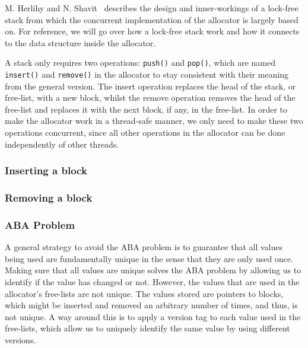 M. Herlihy and N. Shavit~\cite[Chapter 11]{artofmpprogramming} describes the design and inner-workings of a lock-free stack from which the concurrent implementation of the allocator is largely based on. For reference, we will go over how a lock-free stack work and how it connects to the data structure inside the allocator.

A stack only requires two operations: \texttt{push()} and \texttt{pop()}, which are named \texttt{insert()} and \texttt{remove()} in the allocator to stay consistent with their meaning from the general version. The insert operation replaces the head of the stack, or free-list, with a new block, whilst the remove operation removes the head of the free-list and replaces it with the next block, if any, in the free-list. In order to make the allocator work in a thread-safe manner, we only need to make these two operations concurrent, since all other operations in the allocator can be done independently of other threads.

\subsubsection{Inserting a block}

\subsubsection{Removing a block}

\subsubsection{ABA Problem}



A general strategy to avoid the ABA problem is to guarantee that all values being used are fundamentally unique in the sense that they are only used once. Making sure that all values are unique solves the ABA problem by allowing us to identify if the value has changed or not. However, the values that are used in the allocator's free-lists are not unique. The values stored are pointers to blocks, which might be inserted and removed an arbitrary number of times, and thus, is not unique. A way around this is to apply a version tag to each value used in the free-lists, which allow us to uniquely identify the same value by using different versions.

